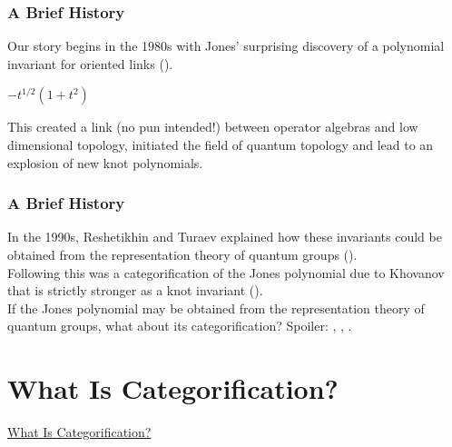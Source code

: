 \documentclass{beamer}
\begin{document}
\begin{frame}
\frametitle{A Brief History}
Our story begins in the 1980s with Jones' surprising discovery of a polynomial invariant for oriented links (\textcolor{structure}{\cite{Jon85}}).
\begin{center}
\quad{\Large $\rightsquigarrow$}\quad $-t^{1/2}(1 + t^2)$
\end{center}
This created a link (no pun intended!) between operator algebras and low dimensional topology, initiated the field of quantum topology and lead to an explosion of new knot polynomials. 
\end{frame}

\begin{frame}
\frametitle{A Brief History}
In the 1990s, Reshetikhin and Turaev explained how these invariants could be obtained from the representation theory of quantum groups (\textcolor{structure}{\cite{RT91}}).\\[2ex]
Following this was a categorification of the Jones polynomial due to Khovanov that is strictly stronger as a knot invariant (\textcolor{structure}{\cite{Kho00}}).\\[2ex]
If the Jones polynomial may be obtained from the representation theory of quantum groups, what about its categorification? Spoiler: \textcolor{structure}{\cite{CR08}}, \textcolor{structure}{\cite{Web13a}}, \textcolor{structure}{\cite{Web13b}}.
\end{frame}


\section{What Is Categorification?}

\begin{frame}
\centerline{\huge\textcolor{structure}{\underline{What Is Categorification?}}}
\end{frame}
\end{document}
